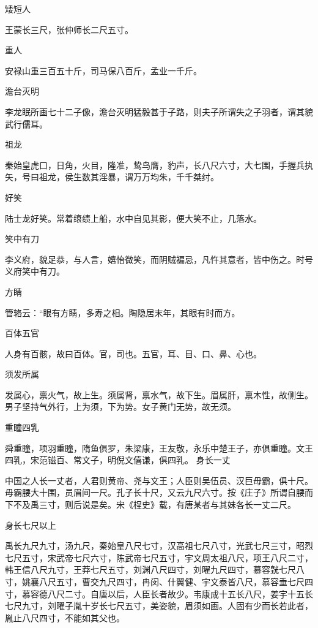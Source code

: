 \documentclass[a4paper,12pt,UTF8,twoside]{ctexbook}
\begin{document}
    矮短人
    
    王蒙长三尺，张仲师长二尺五寸。
    
    重人
    
    安禄山重三百五十斤，司马保八百斤，孟业一千斤。
    
    澹台灭明
    
    李龙眠所画七十二子像，澹台灭明猛毅甚于子路，则夫子所谓失之子羽者，谓其貌武行儒耳。
    
    祖龙
    
    秦始皇虎口，日角，火目，隆准，鸷鸟膺，豹声，长八尺六寸，大七围，手握兵执矢，号曰祖龙，侯生数其淫暴，谓万万均朱，千千桀纣。
    
    好笑
    
    陆士龙好笑。常着缞绩上船，水中自见其影，便大笑不止，几落水。
    
    笑中有刀
    
    李义府，貌足恭，与人言，嬉怡微笑，而阴贼褊忌，凡忤其意者，皆中伤之。时号义府笑中有刀。
    
    方睛
    
    管辂云：“眼有方睛，多寿之相。陶隐居末年，其眼有时而方。
    
    百体五官
    
    人身有百骸，故曰百体。官，司也。五官，耳、目、口、鼻、心也。
    
    须发所属
    
    发属心，禀火气，故上生。须属肾，禀水气，故下生。眉属肝，禀木性，故侧生。男子坚持气外行，上为须，下为势。女子黄门无势，故无须。
    
    重瞳四乳
    
    舜重瞳，项羽重瞳，隋鱼俱罗，朱梁康，王友敬，永乐中楚王子，亦俱重瞳。文王四乳，宋范镃百、常文子，明倪文僖谦，俱四乳。
    身长一丈
    
    中国之人长一丈者，人君则黄帝、尧与文王；人臣则吴伍员、汉巨毋霸，俱十尺。毋霸腰大十围，员眉间一尺。孔子长十尺，又云九尺六寸。按《庄子》所谓自腰而下不及禹三寸，则后说是矣。宋《桯史》载，有唐某者与其妹各长一丈二尺。
    
    身长七尺以上
    
    禹长九尺九寸，汤九尺，秦始皇八尺七寸，汉高祖七尺八寸，光武七尺三寸，昭烈七尺五寸，宋武帝七尺六寸，陈武帝七尺五寸，宇文周太祖八尺，项王八尺二寸，韩王信八尺九寸，王莽七尺五寸，刘渊八尺四寸，刘曜九尺四寸，慕容皝七尺八寸，姚襄八尺五寸，曹交九尺四寸，冉闵、什翼健、宇文泰皆八尺，慕容垂七尺四寸，慕容德八尺二寸。自唐以后，人臣长者故少。韦康成十五长八尺，姜宇十五长七尺九寸，刘曜子胤十岁长七尺五寸，美姿貌，眉须如画。人固有少而长若此者，胤止八尺四寸，不能如其父也。
    
\end{document}
